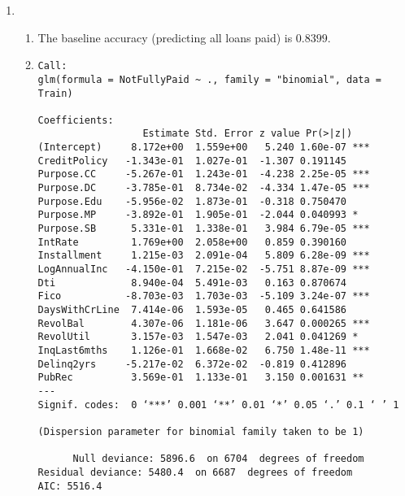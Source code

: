 \documentclass{article}
\begin{document}
\newcommand{\documentcourse}{IIMT2641}
\newcommand{\documentnumber}{4}





\begin{enumerate}[label=\alph*.]
      \item
            \begin{enumerate}[label=\roman*.]
                  \item The baseline accuracy (predicting all loans paid) is $0.8399$.

                  \item
                        \begin{verbatim}
Call:
glm(formula = NotFullyPaid ~ ., family = "binomial", data = Train)

Coefficients:
                  Estimate Std. Error z value Pr(>|z|)    
(Intercept)     8.172e+00  1.559e+00   5.240 1.60e-07 ***
CreditPolicy   -1.343e-01  1.027e-01  -1.307 0.191145    
Purpose.CC     -5.267e-01  1.243e-01  -4.238 2.25e-05 ***
Purpose.DC     -3.785e-01  8.734e-02  -4.334 1.47e-05 ***
Purpose.Edu    -5.956e-02  1.873e-01  -0.318 0.750470    
Purpose.MP     -3.892e-01  1.905e-01  -2.044 0.040993 *  
Purpose.SB      5.331e-01  1.338e-01   3.984 6.79e-05 ***
IntRate         1.769e+00  2.058e+00   0.859 0.390160    
Installment     1.215e-03  2.091e-04   5.809 6.28e-09 ***
LogAnnualInc   -4.150e-01  7.215e-02  -5.751 8.87e-09 ***
Dti             8.940e-04  5.491e-03   0.163 0.870674    
Fico           -8.703e-03  1.703e-03  -5.109 3.24e-07 ***
DaysWithCrLine  7.414e-06  1.593e-05   0.465 0.641586    
RevolBal        4.307e-06  1.181e-06   3.647 0.000265 ***
RevolUtil       3.157e-03  1.547e-03   2.041 0.041269 *  
InqLast6mths    1.126e-01  1.668e-02   6.750 1.48e-11 ***
Delinq2yrs     -5.217e-02  6.372e-02  -0.819 0.412896    
PubRec          3.569e-01  1.133e-01   3.150 0.001631 ** 
---
Signif. codes:  0 ‘***’ 0.001 ‘**’ 0.01 ‘*’ 0.05 ‘.’ 0.1 ‘ ’ 1

(Dispersion parameter for binomial family taken to be 1)

      Null deviance: 5896.6  on 6704  degrees of freedom
Residual deviance: 5480.4  on 6687  degrees of freedom
AIC: 5516.4


\end{verbatim}
\end{enumerate}
\end{enumerate}
\end{document}

